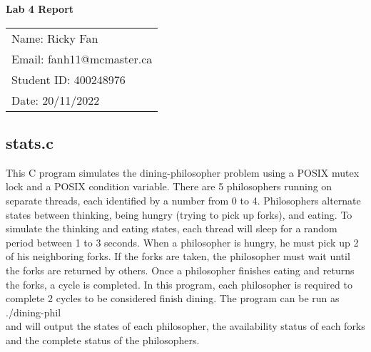 \documentclass[11pt,fleqn]{article}
\begin{document}
\begin{center}
	{\Large \textbf{Lab 4 Report}}\\[6mm]
	\begin{tabular}{l}
        {\large Name: Ricky Fan}       \\
		{\large Email: fanh11@mcmaster.ca} \\
		{\large Student ID: 400248976}    \\
		{\large Date: 20/11/2022}
	\end{tabular}

\end{center}

\medskip

\subsection*{stats.c}
This C program simulates the dining-philosopher problem using 
a POSIX mutex lock and a POSIX condition variable. There are 
5 philosophers running on separate threads, each identified 
by a number from 0 to 4. Philosophers alternate states between 
thinking, being hungry (trying to pick up forks), and eating. 
To simulate the thinking and eating states, each thread will 
sleep for a random period between 1 to 3 seconds. When a 
philosopher is hungry, he must pick up 2 of his neighboring 
forks. If the forks are taken, the philosopher must 
wait until the forks are returned by others. Once a philosopher 
finishes eating and returns the forks, a cycle is completed. 
In this program, each philosopher is required to complete 
2 cycles to be considered finish dining.
The program can be run as \\

./dining-phil \\

\noindent
and will output the states of each philosopher, the availability 
status of each forks and the complete status of the philosophers.



\end{document}

